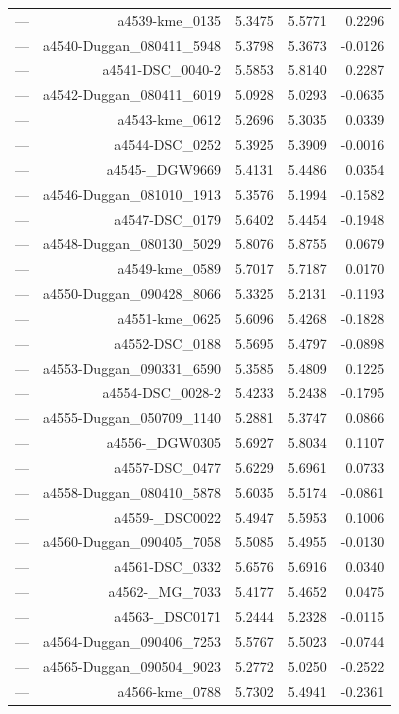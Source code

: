 \begin{table}[htbp]
\begin{tabular}{lrrrr}
— & a4539-kme_0135 & 5.3475 & 5.5771 & 0.2296 \\
— & a4540-Duggan_080411_5948 & 5.3798 & 5.3673 & -0.0126 \\
— & a4541-DSC_0040-2 & 5.5853 & 5.8140 & 0.2287 \\
— & a4542-Duggan_080411_6019 & 5.0928 & 5.0293 & -0.0635 \\
— & a4543-kme_0612 & 5.2696 & 5.3035 & 0.0339 \\
— & a4544-DSC_0252 & 5.3925 & 5.3909 & -0.0016 \\
— & a4545-_DGW9669 & 5.4131 & 5.4486 & 0.0354 \\
— & a4546-Duggan_081010_1913 & 5.3576 & 5.1994 & -0.1582 \\
— & a4547-DSC_0179 & 5.6402 & 5.4454 & -0.1948 \\
— & a4548-Duggan_080130_5029 & 5.8076 & 5.8755 & 0.0679 \\
— & a4549-kme_0589 & 5.7017 & 5.7187 & 0.0170 \\
— & a4550-Duggan_090428_8066 & 5.3325 & 5.2131 & -0.1193 \\
— & a4551-kme_0625 & 5.6096 & 5.4268 & -0.1828 \\
— & a4552-DSC_0188 & 5.5695 & 5.4797 & -0.0898 \\
— & a4553-Duggan_090331_6590 & 5.3585 & 5.4809 & 0.1225 \\
— & a4554-DSC_0028-2 & 5.4233 & 5.2438 & -0.1795 \\
— & a4555-Duggan_050709_1140 & 5.2881 & 5.3747 & 0.0866 \\
— & a4556-_DGW0305 & 5.6927 & 5.8034 & 0.1107 \\
— & a4557-DSC_0477 & 5.6229 & 5.6961 & 0.0733 \\
— & a4558-Duggan_080410_5878 & 5.6035 & 5.5174 & -0.0861 \\
— & a4559-_DSC0022 & 5.4947 & 5.5953 & 0.1006 \\
— & a4560-Duggan_090405_7058 & 5.5085 & 5.4955 & -0.0130 \\
— & a4561-DSC_0332 & 5.6576 & 5.6916 & 0.0340 \\
— & a4562-_MG_7033 & 5.4177 & 5.4652 & 0.0475 \\
— & a4563-_DSC0171 & 5.2444 & 5.2328 & -0.0115 \\
— & a4564-Duggan_090406_7253 & 5.5767 & 5.5023 & -0.0744 \\
— & a4565-Duggan_090504_9023 & 5.2772 & 5.0250 & -0.2522 \\
— & a4566-kme_0788 & 5.7302 & 5.4941 & -0.2361 \\

\end{tabular}
\end{table}
